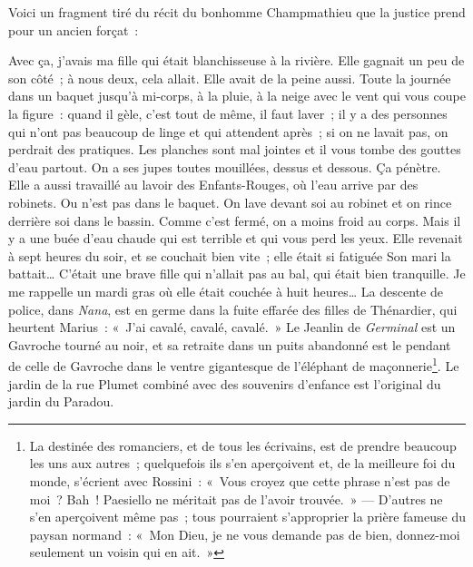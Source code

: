 \documentclass[french,twoside]{book} %
\begin{document}
\noindent Voici un fragment tiré du récit du bonhomme Champmathieu que la justice prend pour un ancien forçat :\par
Avec ça, j’avais ma fille qui était blanchisseuse à la rivière. Elle gagnait un peu de son côté ; à nous deux, cela allait. Elle avait de la peine aussi. Toute la journée dans un baquet jusqu’à mi-corps, à la pluie, à la neige avec le vent qui vous coupe la figure : quand il gèle, c’est tout de même, il faut laver ; il y a des personnes qui n’ont pas beaucoup de linge et qui attendent après ; si on ne lavait pas, on perdrait des pratiques. Les planches sont mal jointes et il vous tombe des gouttes d’eau partout. On a ses jupes toutes mouillées, dessus et dessous. Ça pénètre. Elle a aussi travaillé au lavoir des Enfants-Rouges, où l’eau arrive par des robinets. Ou n’est pas dans le baquet. On lave devant soi au robinet et on rince derrière soi dans le bassin. Comme c’est fermé, on a moins froid au corps. Mais il y a une buée d’eau chaude qui est terrible et qui vous perd les yeux. Elle revenait à sept heures du soir, et se couchait bien vite ; elle était si fatiguée Son mari la battait… C’était une brave fille qui n’allait pas au bal, qui était bien tranquille. Je me rappelle un mardi gras où elle était couchée à huit heures… La descente de police, dans \emph{Nana}, est en germe dans la fuite effarée des filles de Thénardier, qui heurtent Marius : « J’ai cavalé, cavalé, cavalé. » Le Jeanlin de \emph{Germinal} est un Gavroche tourné au noir, et sa retraite dans un puits abandonné est le pendant de celle de Gavroche dans le ventre gigantesque de l’éléphant de maçonnerie\footnote{La destinée des romanciers, et de tous les écrivains, est de prendre beaucoup les uns aux autres ; quelquefois ils s’en aperçoivent et, de la meilleure foi du monde, s’écrient avec Rossini : « Vous croyez que cette phrase n’est pas de moi ? Bah ! Paesiello ne méritait pas de l’avoir trouvée. » — D’autres ne s’en aperçoivent même pas ; tous pourraient s’approprier la prière fameuse du paysan normand : « Mon Dieu, je ne vous demande pas de bien, donnez-moi seulement un voisin qui en ait. »}. Le jardin de la rue Plumet combiné avec des souvenirs d’enfance est l’original du jardin du Paradou.\par
\end{document}
